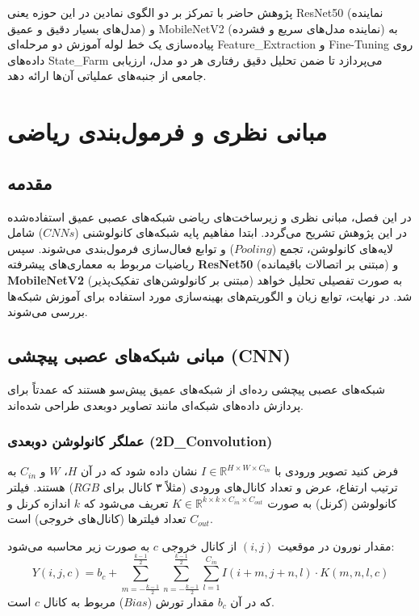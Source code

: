 \documentclass{report}
\begin{document}
 	پژوهش حاضر با تمرکز بر دو الگوی نمادین در این حوزه یعنی ResNet50 (نماینده مدل‌های بسیار دقیق و عمیق) و MobileNetV2 (نماینده مدل‌های سریع و فشرده) به پیاده‌سازی یک خط‌ لوله آموزش دو مرحله‌ای  Feature\_Extraction و  Fine-Tuning روی داده‌های State\_Farm می‌پردازد تا ضمن تحلیل دقیق رفتاری هر دو مدل، ارزیابی جامعی از جنبه‌های عملیاتی آن‌ها ارائه دهد.
 	
 	
 	
 	
 	
 	
 	
 	
 	
 	
 	
 	
 	\chapter{مبانی نظری و فرمول‌بندی ریاضی}
 	
 	\section{مقدمه}
 	در این فصل، مبانی نظری و زیرساخت‌های ریاضی شبکه‌های عصبی عمیق استفاده‌شده در این پژوهش تشریح می‌گردد. ابتدا مفاهیم پایه شبکه‌های کانولوشنی ($CNNs$) شامل لایه‌های کانولوشن، تجمع ($Pooling$) و توابع فعال‌سازی فرمول‌بندی می‌شوند. سپس ریاضیات مربوط به معماری‌های پیشرفته \textbf{ResNet50} (مبتنی بر اتصالات باقیمانده) و \textbf{MobileNetV2} (مبتنی بر کانولوشن‌های تفکیک‌پذیر) به صورت تفصیلی تحلیل خواهد شد. در نهایت، توابع زیان و الگوریتم‌های بهینه‌سازی مورد استفاده برای آموزش شبکه‌ها بررسی می‌شوند.
 	
 	\section{مبانی شبکه‌های عصبی پیچشی (CNN)}
 	شبکه‌های عصبی پیچشی رده‌ای از شبکه‌های عمیق پیش‌سو هستند که عمدتاً برای پردازش داده‌های شبکه‌ای مانند تصاویر دوبعدی طراحی شده‌اند.
 	
 	\subsection{عملگر کانولوشن دوبعدی (2D\_Convolution)}
 	فرض کنید تصویر ورودی با $I \in \mathbb{R}^{H \times W \times C_{in}}$ نشان داده شود که در آن $H$، $W$ و $C_{in}$ به ترتیب ارتفاع، عرض و تعداد کانال‌های ورودی (مثلاً ۳ کانال برای $RGB$) هستند. فیلتر کانولوشن (کرنل) به صورت $K \in \mathbb{R}^{k \times k \times C_{in} \times C_{out}}$ تعریف می‌شود که $k$ اندازه کرنل و $C_{out}$ تعداد فیلترها (کانال‌های خروجی) است.
 	
 	مقدار نورون در موقعیت $(i, j)$ از کانال خروجی $c$ به صورت زیر محاسبه می‌شود:
 	\begin{equation}
 		Y(i, j, c) = b_c + \sum_{m=- \frac{k-1}{2}}^{\frac{k-1}{2}} \sum_{n=- \frac{k-1}{2}}^{\frac{k-1}{2}} \sum_{l=1}^{C_{in}} I(i+m, j+n, l) \cdot K(m, n, l, c)
 	\end{equation}
 	که در آن $b_c$ مقدار تورش ($Bias$) مربوط به کانال $c$ است.
 	
\end{document}
